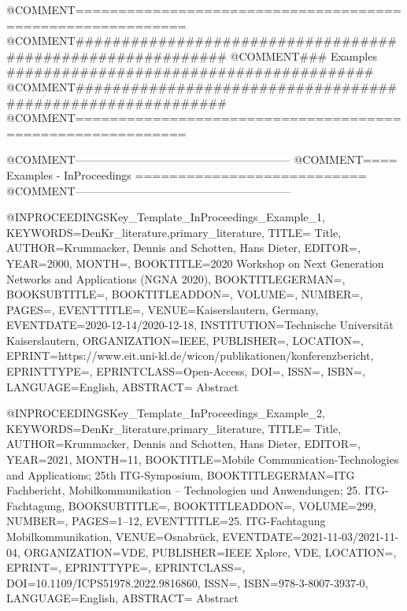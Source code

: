 











@COMMENT{===========================================================}
@COMMENT{###########################################################}
@COMMENT{###    Examples    ########################################}
@COMMENT{###########################################################}
@COMMENT{===========================================================}


@COMMENT{-----------------------------------------------------------}
@COMMENT{====  Examples - InProceedings  ===========================}
@COMMENT{-----------------------------------------------------------}

@INPROCEEDINGS{Key_Template_InProceedings_Example_1,
    KEYWORDS={DenKr_literature,primary_literature},
    TITLE={\begingroup
        Title\endgroup},
    AUTHOR={Krummacker, Dennis and Schotten, Hans Dieter},
    EDITOR={},
    YEAR={2000},
    MONTH={},
    BOOKTITLE={2020 Workshop on Next Generation Networks and Applications (NGNA 2020)},
    BOOKTITLEGERMAN={},
    BOOKSUBTITLE={},
    BOOKTITLEADDON={},
    VOLUME={},
    NUMBER={},
    PAGES={},
    EVENTTITLE={},
    VENUE={Kaiserslautern, Germany},
    EVENTDATE={2020-12-14/2020-12-18},
    INSTITUTION={Technische Universit{\"a}t Kaiserslautern},
    ORGANIZATION={IEEE},
    PUBLISHER={},
    LOCATION={},
    EPRINT={https://www.eit.uni-kl.de/wicon/publikationen/konferenzbericht},
    EPRINTTYPE={},
    EPRINTCLASS={Open-Access},
    DOI={},
    ISSN={},
    ISBN={},
    LANGUAGE={English},
    ABSTRACT={\begingroup
        Abstract\endgroup}
}

@INPROCEEDINGS{Key_Template_InProceedings_Example_2,
    KEYWORDS={DenKr_literature,primary_literature},
    TITLE={\begingroup
        Title\endgroup},
    AUTHOR={Krummacker, Dennis and Schotten, Hans Dieter},
    EDITOR={},
    YEAR={2021},
    MONTH={11},
    BOOKTITLE={Mobile Communication-Technologies and Applications; 25th ITG-Symposium},
    BOOKTITLEGERMAN={ITG Fachbericht, Mobilkommunikation -- Technologien und Anwendungen; 25. ITG-Fachtagung},
    BOOKSUBTITLE={},
    BOOKTITLEADDON={},
    VOLUME={299},
    NUMBER={},
    PAGES={1--12},
    EVENTTITLE={25. ITG-Fachtagung Mobilkommunikation},
    VENUE={Osnabr{\"u}ck},
    EVENTDATE={2021-11-03/2021-11-04},
    ORGANIZATION={VDE},
    PUBLISHER={IEEE Xplore, VDE},
    LOCATION={},
    EPRINT={},
    EPRINTTYPE={},
    EPRINTCLASS={},
    DOI={10.1109/ICPS51978.2022.9816860},
    ISSN={},
    ISBN={978-3-8007-3937-0},
    LANGUAGE={English},
    ABSTRACT={\begingroup
        Abstract\endgroup}
}

